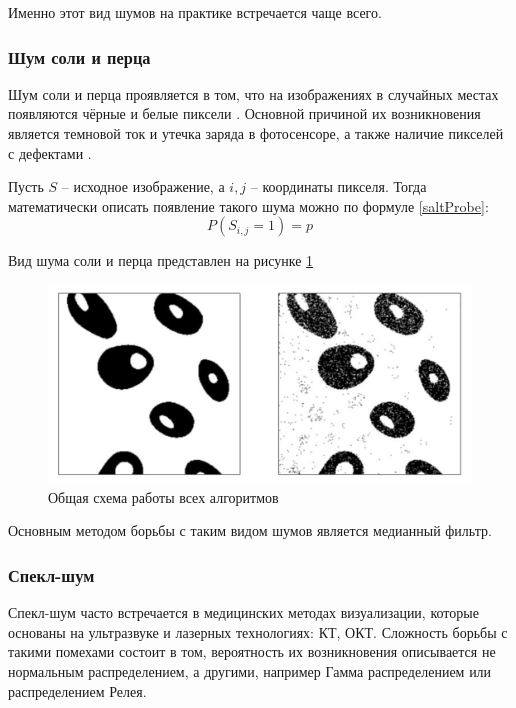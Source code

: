 Именно этот вид шумов на практике встречается чаще всего. 

\subsubsection{Шум соли и перца}
Шум соли и перца проявляется в том, что на изображениях в случайных местах появляются чёрные и белые пиксели \cite{moments}.
Основной причиной их возникновения является темновой ток и утечка заряда в фотосенсоре, а также наличие пикселей с дефектами \cite{shum}.

Пусть $S$ -- исходное изображение, а $i, j$ -- координаты пикселя. 
Тогда математически описать появление такого шума можно по формуле \ref{saltProbe}: 
\begin{equation}
	\label{saltProbe}
	P(S_{i, j} = 1) = p
\end{equation}

Вид шума соли и перца представлен на рисунке \ref{fig::salt}
\FloatBarrier
\begin{figure}[h]	
	\begin{center}
		\includegraphics[width=\linewidth]{inc/png/salt.png}
	\end{center}
	\captionsetup{justification=centering}
	\caption{Общая схема работы всех алгоритмов}
	\label{fig::salt}
\end{figure}
\FloatBarrier

Основным методом борьбы с таким видом шумов является медианный фильтр.

\subsubsection{Спекл-шум}
Спекл-шум часто встречается в медицинских методах визуализации, которые основаны на ультразвуке и лазерных технологиях: КТ, ОКТ.
Сложность борьбы с такими помехами состоит в том, вероятность их возникновения описывается не нормальным распределением, а другими, например Гамма распределением или распределением Релея.

